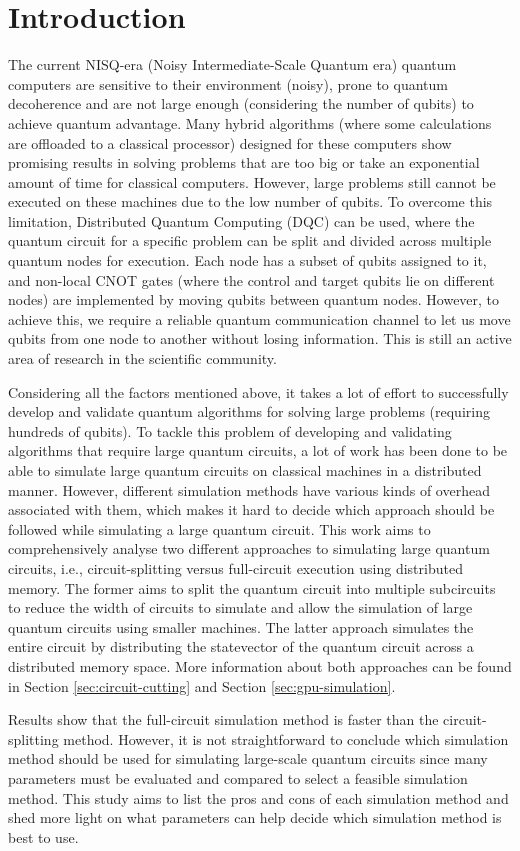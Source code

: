 \section{Introduction}
\label{chap:introduction}

The current NISQ-era (Noisy Intermediate-Scale Quantum era) quantum computers are sensitive to their environment (noisy), prone to quantum decoherence and are not large enough (considering the number of qubits) to achieve quantum advantage. Many hybrid algorithms (where some calculations are offloaded to a classical processor) designed for these computers show promising results in solving problems that are too big or take an exponential amount of time for classical computers. However, large problems still cannot be executed on these machines due to the low number of qubits. To overcome this limitation, Distributed Quantum Computing (DQC) can be used, where the quantum circuit for a specific problem can be split and divided across multiple quantum nodes for execution. Each node has a subset of qubits assigned to it, and non-local CNOT gates (where the control and target qubits lie on different nodes) are implemented by moving qubits between quantum nodes. However, to achieve this, we require a reliable quantum communication channel to let us move qubits from one node to another without losing information. This is still an active area of research in the scientific community.  

Considering all the factors mentioned above, it takes a lot of effort to successfully develop and validate quantum algorithms for solving large problems (requiring hundreds of qubits). To tackle this problem of developing and validating algorithms that require large quantum circuits, a lot of work has been done to be able to simulate large quantum circuits on classical machines in a distributed manner. However, different simulation methods have various kinds of overhead associated with them, which makes it hard to decide which approach should be followed while simulating a large quantum circuit. This work aims to comprehensively analyse two different approaches to simulating large quantum circuits, i.e., circuit-splitting versus full-circuit execution using distributed memory. The former aims to split the quantum circuit into multiple subcircuits to reduce the width of circuits to simulate and allow the simulation of large quantum circuits using smaller machines. The latter approach simulates the entire circuit by distributing the statevector of the quantum circuit across a distributed memory space. More information about both approaches can be found in Section \ref{sec:circuit-cutting} and Section \ref{sec:gpu-simulation}.  

Results show that the full-circuit simulation method is faster than the circuit-splitting method. However, it is not straightforward to conclude which simulation method should be used for simulating large-scale quantum circuits since many parameters must be evaluated and compared to select a feasible simulation method. This study aims to list the pros and cons of each simulation method and shed more light on what parameters can help decide which simulation method is best to use.
